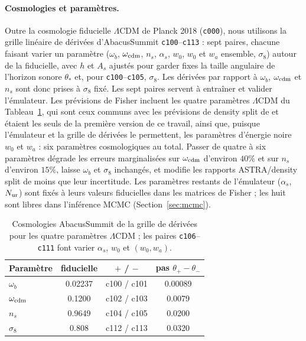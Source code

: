 \documentclass[11pt,twocolumn]{article}
\begin{document}
\paragraph{Cosmologies et paramètres.} Outre la cosmologie fiducielle $\Lambda$CDM de Planck 2018 (\texttt{c000}), nous utilisons la grille linéaire de dérivées d'AbacusSummit \texttt{c100}--\texttt{c113} : sept paires, chacune faisant varier un paramètre ($\omega_b$, $\omega_{\rm cdm}$, $n_s$, $\alpha_s$, $w_0$, $w_0$ et $w_a$ ensemble, $\sigma_8$) autour de la fiducielle, avec $h$ et $A_s$ ajustés pour garder fixes la taille angulaire de l'horizon sonore $\theta_*$ et, pour \texttt{c100}--\texttt{c105}, $\sigma_8$. Les dérivées par rapport à $\omega_b$, $\omega_{\rm cdm}$ et $n_s$ sont donc prises à $\sigma_8$ fixé. Les sept paires servent à entraîner et valider l'émulateur. Les prévisions de Fisher incluent les quatre paramètres $\Lambda$CDM du Tableau~\ref{tab:cosmo}, qui sont ceux communs avec les prévisions de density split de \cite{Paillas2023} et étaient les seuls de la première version de ce travail, ainsi que, puisque l'émulateur et la grille de dérivées le permettent, les paramètres d'énergie noire $w_0$ et $w_a$ : six paramètres cosmologiques au total. Passer de quatre à six paramètres dégrade les erreurs marginalisées sur $\omega_{\rm cdm}$ d'environ $40\%$ et sur $n_s$ d'environ $15\%$, laisse $\omega_b$ et $\sigma_8$ inchangés, et modifie les rapports ASTRA/density split de moins que leur incertitude. Les paramètres restants de l'émulateur ($\alpha_s$, $N_{\rm ur}$) sont fixés à leurs valeurs fiducielles dans les matrices de Fisher ; les huit sont libres dans l'inférence MCMC (Section~\ref{sec:mcmc}).

\begin{table}[!htbp]
\centering\small
\begin{tabular}{lccc}
\toprule
Paramètre & fiducielle & $+$ / $-$ & pas $\theta_+-\theta_-$ \\
\midrule
$\omega_b$ & 0.02237 & c100 / c101 & 0.00089 \\
$\omega_{\rm cdm}$ & 0.1200 & c102 / c103 & 0.0079 \\
$n_s$ & 0.9649 & c104 / c105 & 0.0200 \\
$\sigma_8$ & 0.808 & c112 / c113 & 0.0320 \\
\bottomrule
\end{tabular}
\caption{Cosmologies AbacusSummit de la grille de dérivées pour les quatre paramètres $\Lambda$CDM ; les paires \texttt{c106}--\texttt{c111} font varier $\alpha_s$, $w_0$ et $(w_0, w_a)$.}
\label{tab:cosmo}
\end{table}
\end{document}
